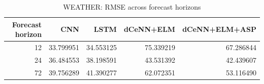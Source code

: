 \begin{table}
\caption{WEATHER: RMSE across forecast horizons}
\begin{tabular}{rrrrr}
\toprule
Forecast horizon & CNN & LSTM & dCeNN+ELM & dCeNN+ELM+ASP \\
\midrule
12 & 33.799951 & 34.553125 & 75.339219 & 67.286844 \\
24 & 36.484553 & 38.198591 & 43.531392 & 42.439607 \\
72 & 39.756289 & 41.390277 & 62.072351 & 53.116490 \\
\bottomrule
\end{tabular}
\end{table}
